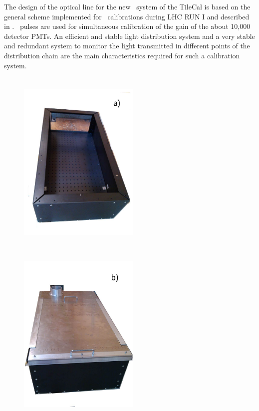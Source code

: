 The design of the optical line for the new \lasii~system of the TileCal is based on the general scheme implemented for \laser~calibrations
during LHC RUN I and described in \cite{ref:lasercalvet}. \laser~pulses are used for
simultaneous calibration of the gain of the about 10,000 detector PMTs.
An efficient and stable light distribution system and a very stable and redundant
system to monitor the light transmitted in different points of the distribution
chain are the main characteristics required for such a calibration system.

% 
\begin{figure}[htbp]
\begin{center} 
\includegraphics[width=5.8cm, height=9cm]{figures/Optics_box_1}
\includegraphics[width=5.8cm, height=9cm]{figures/Optics_box_2}

\end{center}
\end{figure}
